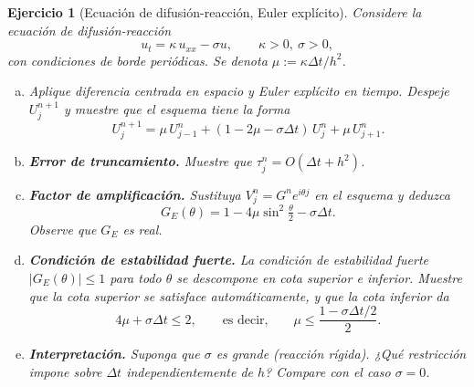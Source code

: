 \documentclass[12pt]{article}
\newtheorem{exercise}{Ejercicio}
\def\dt{\Delta t}
\begin{document}
\begin{exercise}[Ecuación de difusión-reacción, Euler explícito]
Considere la ecuación de difusión-reacción
\[
  u_t = \kappa\,u_{xx} - \sigma u,\qquad \kappa>0,\ \sigma>0,
\]
con condiciones de borde periódicas. Se denota $\mu:=\kappa\dt/h^2$.
\begin{enumerate}[(a)]
\item Aplique diferencia centrada en espacio y Euler explícito en tiempo. Despeje $U_j^{n+1}$ y muestre que el esquema tiene la forma
\[
  U_j^{n+1} = \mu\,U_{j-1}^n + (1-2\mu-\sigma\dt)\,U_j^n + \mu\,U_{j+1}^n.
\]

\item \textbf{Error de truncamiento.} Muestre que $\tau_j^n = O(\dt + h^2)$.

\item \textbf{Factor de amplificación.} Sustituya $V_j^n = G^n e^{i\theta j}$ en el esquema y deduzca
\[
  G_E(\theta) = 1 - 4\mu\sin^2\!\tfrac{\theta}{2} - \sigma\dt.
\]
Observe que $G_E$ es real.

\item \textbf{Condición de estabilidad fuerte.} La condición de estabilidad fuerte $|G_E(\theta)|\le 1$ para todo $\theta$ se descompone en cota superior e inferior. Muestre que la cota superior se satisface automáticamente, y que la cota inferior da
\[
  4\mu + \sigma\dt \le 2,\qquad\text{es decir,}\qquad
  \mu \le \frac{1-\sigma\dt/2}{2}.
\]

\item \textbf{Interpretación.} Suponga que $\sigma$ es grande (reacción rígida). ¿Qué restricción impone sobre $\dt$ independientemente de $h$? Compare con el caso $\sigma=0$.
\end{enumerate}
\end{exercise}
\end{document}
